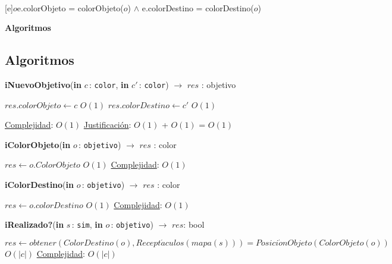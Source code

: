 \documentclass[a4paper,10pt]{article}
\let\TipoVariable=\texttt
\let\ModificadorArgumento=\textbf
\newcommand{\In}[2]{\ModificadorArgumento{in} \ensuremath{#1}\,: \TipoVariable{#2}\xspace}
\newenvironment{Algoritmos}{%
  \vspace*{2ex}%
  \noindent\textbf{\Large Algoritmos}%
  \vspace*{2ex}%
}{}
\begin{document}

  ~

  [e]{$o$}{e.colorObjeto = colorObjeto($o$) $\land$ e.colorDestino = colorDestino($o$)}


\begin{Algoritmos}
  
\medskip

\subsection{Algoritmos}

  
\begin{algorithm}[H]{\textbf{iNuevoObjetivo}(\In{c}{color}, \In{c'}{color}) $\to$ $res$ : objetivo}
      \begin{algorithmic}[1]
       \State $res.colorObjeto \gets c$     \Comment $O(1)$
       \State $res.colorDestino \gets c'$   \Comment $O(1)$
      
      \medskip
      \Statex \underline{Complejidad}: $O(1)$
      \Statex \underline{Justificación}: $O(1)$ + $O(1)$ = $O(1)$
      \end{algorithmic}
\end{algorithm}  
  
  
\begin{algorithm}[H]{\textbf{iColorObjeto}(\In{o}{objetivo}) $\to$ $res$ : color}
      \begin{algorithmic}[1]
       \State $res \gets o.ColorObjeto$   \Comment $O(1)$
      \medskip
      \Statex \underline{Complejidad}: $O(1)$
      \end{algorithmic}
\end{algorithm}    
  
  
\begin{algorithm}[H]{\textbf{iColorDestino}(\In{o}{objetivo}) $\to$ $res$ : color}
      \begin{algorithmic}[1]
       \State $res \gets o.colorDestino$   \Comment $O(1)$
      \medskip
      \Statex \underline{Complejidad}: $O(1)$
      \end{algorithmic}
\end{algorithm}   
  
  
\begin{algorithm}[H]{\textbf{iRealizado?}(\In{s}{sim}, \In{o}{objetivo}) $\to$ $res$: bool}
      \begin{algorithmic}[1]
       \State $res \gets obtener(ColorDestino(o), Recept\acute{a}culos(mapa(s))) = Posici\acute{o}nObjeto(ColorObjeto(o))$   \Comment $O(|c|)$
      \medskip
      \Statex \underline{Complejidad}: $O(|c|)$
      \end{algorithmic}
\end{algorithm}  


\end{Algoritmos}
\end{document}
